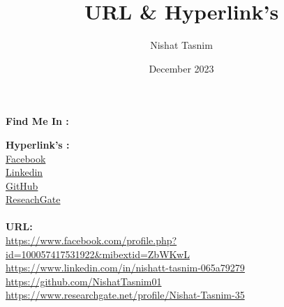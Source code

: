 \documentclass{article}
\title{URL \& Hyperlink's}
\author{Nishat Tasnim}
\date{December 2023}
\begin{document}
\maketitle

\begin{center}
    \textbf{Find Me In :}
\end{center}
\textbf{Hyperlink's :}\\
\href{https://www.facebook.com/profile.php?id=100057417531922&mibextid=ZbWKwL}{Facebook}\\
\href{https://www.linkedin.com/in/nishatt-tasnim-065a79279}{Linkedin}\\
\href{https://github.com/NishatTasnim01}{GitHub}\\
\href{https://www.researchgate.net/profile/Nishat-Tasnim-35}{ReseachGate}\\
\\
\textbf{URL:}\\
\url{https://www.facebook.com/profile.php?id=100057417531922&mibextid=ZbWKwL}\\
\url{https://www.linkedin.com/in/nishatt-tasnim-065a79279}\\
\url{https://github.com/NishatTasnim01}\\
\url{https://www.researchgate.net/profile/Nishat-Tasnim-35}
\end{document}
